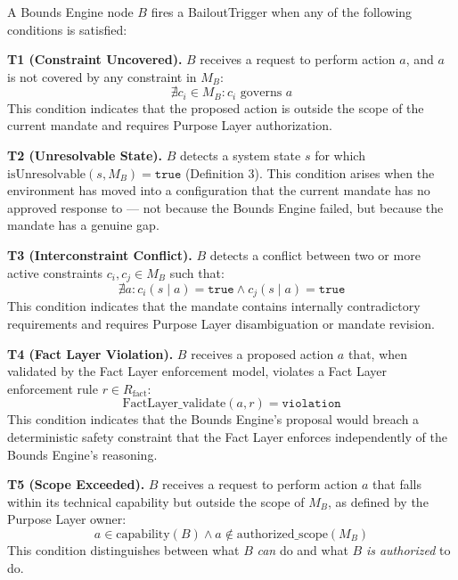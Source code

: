 \documentclass[12pt]{article}
\begin{document}
\bigskip

A Bounds Engine node $B$ fires a BailoutTrigger when any of the following conditions is satisfied:

\bigskip

\noindent\textbf{T1 (Constraint Uncovered).} $B$ receives a request to perform action $a$, and $a$ is not covered by any constraint in $M_B$:
\begin{equation}
\nexists c_i \in M_B : c_i \text{ governs } a
\end{equation}
This condition indicates that the proposed action is outside the scope of the current mandate and requires Purpose Layer authorization.

\bigskip

\noindent\textbf{T2 (Unresolvable State).} $B$ detects a system state $s$ for which $\text{isUnresolvable}(s, M_B) = \texttt{true}$ (Definition 3). This condition arises when the environment has moved into a configuration that the current mandate has no approved response to --- not because the Bounds Engine failed, but because the mandate has a genuine gap.

\bigskip

\noindent\textbf{T3 (Interconstraint Conflict).} $B$ detects a conflict between two or more active constraints $c_i, c_j \in M_B$ such that:
\begin{equation}
\nexists a : c_i(s \mid a) = \texttt{true} \land c_j(s \mid a) = \texttt{true}
\end{equation}
This condition indicates that the mandate contains internally contradictory requirements and requires Purpose Layer disambiguation or mandate revision.

\bigskip

\noindent\textbf{T4 (Fact Layer Violation).} $B$ receives a proposed action $a$ that, when validated by the Fact Layer enforcement model, violates a Fact Layer enforcement rule $r \in R_{\text{fact}}$:
\begin{equation}
\text{FactLayer\_validate}(a, r) = \texttt{violation}
\end{equation}
This condition indicates that the Bounds Engine's proposal would breach a deterministic safety constraint that the Fact Layer enforces independently of the Bounds Engine's reasoning.

\bigskip

\noindent\textbf{T5 (Scope Exceeded).} $B$ receives a request to perform action $a$ that falls within its technical capability but outside the scope of $M_B$, as defined by the Purpose Layer owner:
\begin{equation}
a \in \text{capability}(B) \land a \notin \text{authorized\_scope}(M_B)
\end{equation}
This condition distinguishes between what $B$ \textit{can} do and what $B$ \textit{is authorized} to do.
\end{document}
